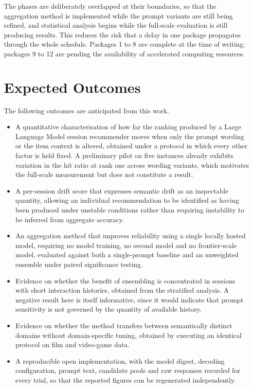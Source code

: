 \documentclass[12pt,a4paper,oneside]{report}
\begin{document}
The phases are deliberately overlapped at their boundaries, so that the
aggregation method is implemented while the prompt variants are still being
refined, and statistical analysis begins while the full-scale evaluation is
still producing results. This reduces the risk that a delay in one package
propagates through the whole schedule. Packages 1 to 8 are complete at the time
of writing; packages 9 to 12 are pending the availability of accelerated
computing resources.

\chapter{Expected Outcomes}

The following outcomes are anticipated from this work.

\begin{itemize}[leftmargin=*]
\item A quantitative characterisation of how far the ranking produced by a Large
Language Model session recommender moves when only the prompt wording or the
item context is altered, obtained under a protocol in which every other factor
is held fixed. A preliminary pilot on five instances already exhibits variation
in the hit ratio at rank one across wording variants, which motivates the
full-scale measurement but does not constitute a result.

\item A per-session drift score that expresses semantic drift as an inspectable
quantity, allowing an individual recommendation to be identified as having been
produced under unstable conditions rather than requiring instability to be
inferred from aggregate accuracy.

\item An aggregation method that improves reliability using a single locally
hosted model, requiring no model training, no second model and no frontier-scale
model, evaluated against both a single-prompt baseline and an unweighted
ensemble under paired significance testing.

\item Evidence on whether the benefit of ensembling is concentrated in sessions
with short interaction histories, obtained from the stratified analysis. A
negative result here is itself informative, since it would indicate that prompt
sensitivity is not governed by the quantity of available history.

\item Evidence on whether the method transfers between semantically distinct
domains without domain-specific tuning, obtained by executing an identical
protocol on film and video-game data.

\item A reproducible open implementation, with the model digest, decoding
configuration, prompt text, candidate pools and raw responses recorded for every
trial, so that the reported figures can be regenerated independently.
\end{itemize}
\end{document}
